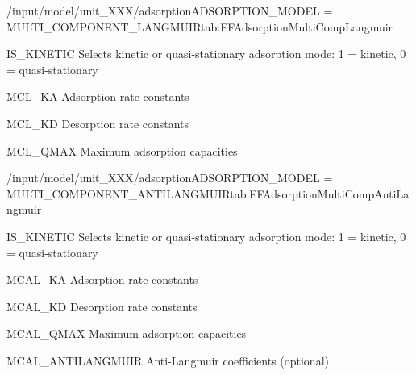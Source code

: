 \begin{condsubgroup}{/input/model/unit\_XXX/adsorption}{ADSORPTION\_MODEL = MULTI\_COMPONENT\_LANGMUIR}{tab:FFAdsorptionMultiCompLangmuir}
  \begin{dataset}[type=int,range={$\{ 0,1 \}$},length=1]{IS\_KINETIC}
    Selects kinetic or quasi-stationary adsorption mode: 1 = kinetic, 0 = quasi-stationary
  \end{dataset}
  \begin{dataset}[type=double,range={$\geq 0$},length={\texttt{NCOMP}}]{MCL\_KA}
    Adsorption rate constants
  \end{dataset}
  \begin{dataset}[unit=\si{\per\second}, type=double,range={$\geq 0$},length={\texttt{NCOMP}}]{MCL\_KD}
    Desorption rate constants
  \end{dataset}
  \begin{dataset}[unit=\si{\mol\per\cubic\metre\of{SP}}, type=double,range={$> 0$},length={\texttt{NCOMP}}]{MCL\_QMAX}
    Maximum adsorption capacities
  \end{dataset}
\end{condsubgroup}

\begin{condsubgroup}{/input/model/unit\_XXX/adsorption}{ADSORPTION\_MODEL = MULTI\_COMPONENT\_ANTILANGMUIR}{tab:FFAdsorptionMultiCompAntiLangmuir}
  \begin{dataset}[type=int,range={$\{ 0,1 \}$},length=1]{IS\_KINETIC}
    Selects kinetic or quasi-stationary adsorption mode: 1 = kinetic, 0 = quasi-stationary
  \end{dataset}
  \begin{dataset}[unit=\si{\cubic\metre\of{MP}\per\mol\per\second}, type=double,range={$\geq 0$},length={\texttt{NCOMP}}]{MCAL\_KA}
    Adsorption rate constants
  \end{dataset}
  \begin{dataset}[unit=\si{\per\second}, type=double,range={$\geq 0$},length={\texttt{NCOMP}}]{MCAL\_KD}
    Desorption rate constants
  \end{dataset}
  \begin{dataset}[unit=\si{\mol\per\cubic\metre\of{SP}}, type=double,range={$> 0$},length={\texttt{NCOMP}}]{MCAL\_QMAX}
    Maximum adsorption capacities
  \end{dataset}
  \begin{dataset}[unit=\si{\mol\per\cubic\metre\of{SP}}, type=double,range={$\{ -1, 1\}$},length={\texttt{NCOMP}}]{MCAL\_ANTILANGMUIR}
    Anti-Langmuir coefficients (optional)
  \end{dataset}
\end{condsubgroup}

